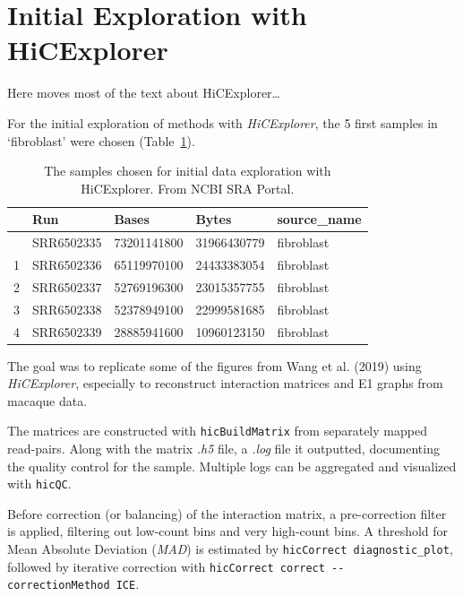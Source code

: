 \documentclass[
  11pt,
  a4paper,
]{scrbook}
\let\oldemph\emph
\renewcommand\emph[1]{\oldemph{\color{gray}#1}}
\begin{document}
\section{Initial Exploration with
HiCExplorer}\label{initial-exploration-with-hicexplorer}

Here moves most of the text about HiCExplorer\ldots{}

For the initial exploration of methods with \emph{HiCExplorer}, the 5
first samples in `fibroblast' were chosen
(Table~\ref{tbl-hic-exploration}).

\small

\begin{longtable}[]{@{}lllll@{}}

\caption{\label{tbl-hic-exploration}The samples chosen for initial data
exploration with HiCExplorer. From NCBI SRA Portal.}

\tabularnewline

\toprule\noalign{}
& Run & Bases & Bytes & source\_name \\
\midrule\noalign{}
\endhead
\bottomrule\noalign{}
\endlastfoot
0 & SRR6502335 & 73201141800 & 31966430779 & fibroblast \\
1 & SRR6502336 & 65119970100 & 24433383054 & fibroblast \\
2 & SRR6502337 & 52769196300 & 23015357755 & fibroblast \\
3 & SRR6502338 & 52378949100 & 22999581685 & fibroblast \\
4 & SRR6502339 & 28885941600 & 10960123150 & fibroblast \\

\end{longtable}

\normalsize

The goal was to replicate some of the figures from Wang et al. (2019)
using \emph{HiCExplorer}, especially to reconstruct interaction matrices
and E1 graphs from macaque data.

The matrices are constructed with \texttt{hicBuildMatrix} from
separately mapped read-pairs. Along with the matrix \emph{.h5} file, a
\emph{.log} file it outputted, documenting the quality control for the
sample. Multiple logs can be aggregated and visualized with
\texttt{hicQC}.

Before correction (or balancing) of the interaction matrix, a
pre-correction filter is applied, filtering out low-count bins and very
high-count bins. A threshold for Mean Absolute Deviation (\emph{MAD}) is
estimated by \texttt{hicCorrect\ diagnostic\_plot}, followed by
iterative correction with
\texttt{hicCorrect\ correct\ -\/-correctionMethod\ ICE}.
\end{document}
